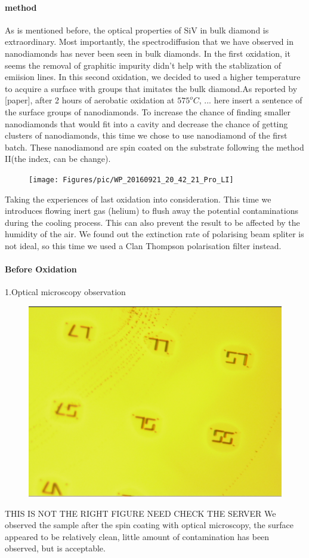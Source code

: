 \paragraph{method} As is mentioned before, the optical properties of SiV in bulk diamond is extraordinary. Most importantly, the spectrodiffusion that we have observed in nanodiamonds has never been seen in bulk diamonds. In the first oxidation, it seems the removal of graphitic impurity didn't help with the stablization of emiision lines. In this second oxidation, we decided to used a higher temperature to acquire a surface with groups that imitates the bulk diamond.As reported by [paper], after 2 hours of aerobatic oxidation at $575^{o}C$, ... here insert a sentence of the surface groups of nanodiamonds. To increase the chance of finding smaller nanodiamonds that would fit into a cavity and decrease the chance of getting clusters of nanodiamonds, this time we chose to use nanodiamond of the first batch. These nanodiamond are spin coated on the substrate following the method II(the index, can be change).
\FloatBarrier
\begin{figure}[h]
\centering
\texttt{[image: Figures/pic/WP\_20160921\_20\_42\_21\_Pro\_LI]}
\caption{}
\label{fig:wp20160921204221proli}
\end{figure}
\FloatBarrier
Taking the experiences of last oxidation into consideration. This time we introduces flowing inert gas (helium) to flush away the potential contaminations during the cooling process. This can also prevent the result to be affected by the humidity of the air.
We found out the extinction rate of polarising beam spliter is not ideal, so this time we used a Clan Thompson polarisation filter instead.

\paragraph{Before Oxidation}
1.Optical microscopy observation
\FloatBarrier
\begin{figure}[h]
\centering
\includegraphics[width=0.7\linewidth]{Figures/pic/20150907_sample214_spincoated_5}
\caption{}
\label{fig:20150907sample214spincoated5}
\end{figure}
\FloatBarrier  
THIS IS NOT THE RIGHT FIGURE NEED CHECK THE SERVER
We observed the sample after the spin coating with optical microscopy, the surface appeared to be relatively clean, little amount of contamination has been observed, but is acceptable.

